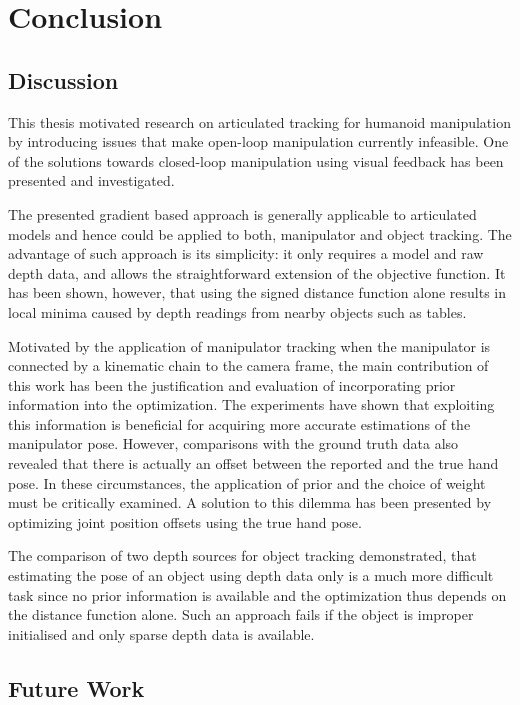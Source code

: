 \chapter{Conclusion}
\label{sec:conclusion}

\section{Discussion}

This thesis motivated research on articulated tracking for humanoid manipulation by introducing issues that make open-loop manipulation currently infeasible. One of the solutions towards closed-loop manipulation using visual feedback has been presented and investigated.

The presented gradient based approach is generally applicable to articulated models and hence could be applied to both, manipulator and object tracking. The advantage of such approach is its simplicity: it only requires a model and raw depth data, and allows the straightforward extension of the objective function.
It has been shown, however, that using the signed distance function alone results in local minima caused by depth readings from nearby objects such as tables.

Motivated by the application of manipulator tracking when the manipulator is connected by a kinematic chain to the camera frame, the main contribution of this work has been the justification and evaluation of incorporating prior information into the optimization.
The experiments have shown that exploiting this information is beneficial for acquiring more accurate estimations of the manipulator pose.
However, comparisons with the ground truth data also revealed that there is actually an offset between the reported and the true hand pose. In these circumstances, the application of prior and the choice of weight must be critically examined. A solution to this dilemma has been presented by optimizing joint position offsets using the true hand pose.

The comparison of two depth sources for object tracking demonstrated, that estimating the pose of an object using depth data only is a much more difficult task since no prior information is available and the optimization thus depends on the distance function alone. Such an approach fails if the object is improper initialised and only sparse depth data is available.


\section{Future Work}

